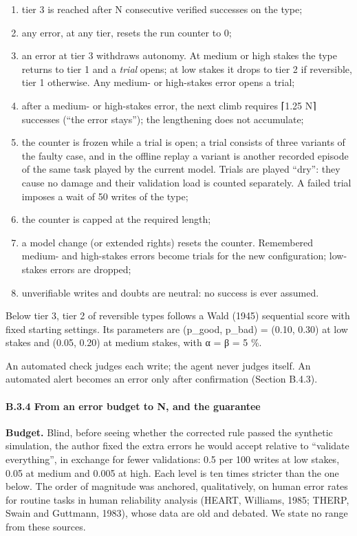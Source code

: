 \begin{enumerate}
\def\labelenumi{\arabic{enumi}.}
\tightlist
\item
  tier 3 is reached after N consecutive verified successes on the type;
\item
  any error, at any tier, resets the run counter to 0;
\item
  an error at tier 3 withdraws autonomy. At medium or high stakes the type returns to tier 1 and a \emph{trial} opens; at low stakes it drops to tier 2 if reversible, tier 1 otherwise. Any medium- or high-stakes error opens a trial;
\item
  after a medium- or high-stakes error, the next climb requires ⌈1.25 N⌉ successes (``the error stays''); the lengthening does not accumulate;
\item
  the counter is frozen while a trial is open; a trial consists of three variants of the faulty case, and in the offline replay a variant is another recorded episode of the same task played by the current model. Trials are played ``dry'': they cause no damage and their validation load is counted separately. A failed trial imposes a wait of 50 writes of the type;
\item
  the counter is capped at the required length;
\item
  a model change (or extended rights) resets the counter. Remembered medium- and high-stakes errors become trials for the new configuration; low-stakes errors are dropped;
\item
  unverifiable writes and doubts are neutral: no success is ever assumed.
\end{enumerate}

Below tier 3, tier 2 of reversible types follows a Wald (1945) sequential score with fixed starting settings. Its parameters are (p\_good, p\_bad) = (0.10, 0.30) at low stakes and (0.05, 0.20) at medium stakes, with α = β = 5 \%.

An automated check judges each write; the agent never judges itself. An automated alert becomes an error only after confirmation (Section B.4.3).

\paragraph{B.3.4 From an error budget to N, and the guarantee}\label{b.3.4-from-an-error-budget-to-n-and-the-guarantee}

\textbf{Budget.} Blind, before seeing whether the corrected rule passed the synthetic simulation, the author fixed the extra errors he would accept relative to ``validate everything'', in exchange for fewer validations: 0.5 per 100 writes at low stakes, 0.05 at medium and 0.005 at high. Each level is ten times stricter than the one below. The order of magnitude was anchored, qualitatively, on human error rates for routine tasks in human reliability analysis (HEART, Williams, 1985; THERP, Swain and Guttmann, 1983), whose data are old and debated. We state no range from these sources.

